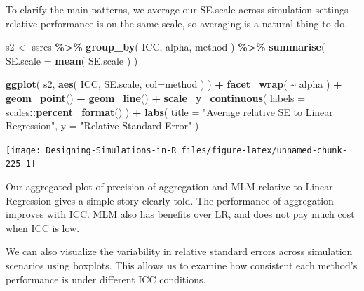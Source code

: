 \documentclass[
]{book}
\newenvironment{Shaded}{\begin{snugshade}}{\end{snugshade}}
\newcommand{\AttributeTok}[1]{\textcolor[rgb]{0.13,0.29,0.53}{#1}}
\newcommand{\FunctionTok}[1]{\textcolor[rgb]{0.13,0.29,0.53}{\textbf{#1}}}
\newcommand{\NormalTok}[1]{#1}
\newcommand{\OtherTok}[1]{\textcolor[rgb]{0.56,0.35,0.01}{#1}}
\newcommand{\SpecialCharTok}[1]{\textcolor[rgb]{0.81,0.36,0.00}{\textbf{#1}}}
\newcommand{\StringTok}[1]{\textcolor[rgb]{0.31,0.60,0.02}{#1}}
\begin{document}
To clarify the main patterns, we average our SE.scale across simulation settings---relative performance is on the same scale, so averaging is a natural thing to do.

\begin{Shaded}
\begin{Highlighting}[]
\NormalTok{s2 }\OtherTok{\textless{}{-}} 
\NormalTok{  ssres }\SpecialCharTok{\%\textgreater{}\%} 
  \FunctionTok{group\_by}\NormalTok{( ICC, alpha, method ) }\SpecialCharTok{\%\textgreater{}\%}
  \FunctionTok{summarise}\NormalTok{( }\AttributeTok{SE.scale =} \FunctionTok{mean}\NormalTok{( SE.scale ) )}

\FunctionTok{ggplot}\NormalTok{( s2, }\FunctionTok{aes}\NormalTok{( ICC, SE.scale, }\AttributeTok{col=}\NormalTok{method ) ) }\SpecialCharTok{+}
  \FunctionTok{facet\_wrap}\NormalTok{( }\SpecialCharTok{\textasciitilde{}}\NormalTok{ alpha ) }\SpecialCharTok{+}
  \FunctionTok{geom\_point}\NormalTok{() }\SpecialCharTok{+} \FunctionTok{geom\_line}\NormalTok{() }\SpecialCharTok{+}
  \FunctionTok{scale\_y\_continuous}\NormalTok{( }\AttributeTok{labels =}\NormalTok{ scales}\SpecialCharTok{::}\FunctionTok{percent\_format}\NormalTok{() ) }\SpecialCharTok{+}
  \FunctionTok{labs}\NormalTok{( }\AttributeTok{title =} \StringTok{"Average relative SE to Linear Regression"}\NormalTok{,}
        \AttributeTok{y =} \StringTok{"Relative Standard Error"}\NormalTok{ )}
\end{Highlighting}
\end{Shaded}

\begin{center}\texttt{[image: Designing-Simulations-in-R\_files/figure-latex/unnamed-chunk-225-1]} \end{center}

Our aggregated plot of precision of aggregation and MLM relative to Linear Regression gives a simple story clearly told.
The performance of aggregation improves with ICC.
MLM also has benefits over LR, and does not pay much cost when ICC is low.

We can also visualize the variability in relative standard errors across simulation scenarios using boxplots.
This allows us to examine how consistent each method's performance is under different ICC conditions.
\end{document}
